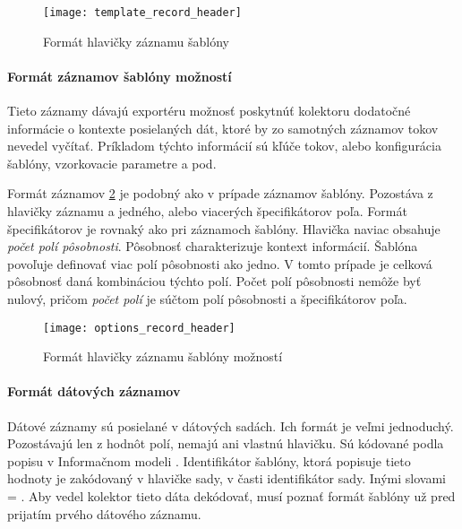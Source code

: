 \begin{figure}[ht!]
\centering
\texttt{[image: template\_record\_header]}
\caption{Formát hlavičky záznamu šablóny}\label{o:template_record_header}
\end{figure}

\paragraph{Formát záznamov šablóny možností}

Tieto záznamy dávajú exportéru možnosť poskytnúť kolektoru dodatočné informácie o kontexte posielaných dát, 
ktoré by zo samotných 
záznamov tokov nevedel vyčítať. Príkladom týchto informácií sú kľúče tokov, alebo konfigurácia šablóny,
vzorkovacie parametre a pod.

Formát záznamov \ref{o:options_record_header} je podobný ako v prípade záznamov šablóny. Pozostáva z hlavičky záznamu 
a jedného, alebo viacerých špecifikátorov poľa. Formát špecifikátorov je rovnaký ako pri záznamoch šablóny.
Hlavička naviac obsahuje \emph{počet polí pôsobnosti}. Pôsobnosť charakterizuje kontext 
informácií. Šablóna povoľuje 
definovať viac polí pôsobnosti ako jedno. V tomto prípade je celková pôsobnosť daná kombináciou týchto polí.
Počet polí pôsobnosti nemôže byť nulový, pričom \emph{počet polí} je 
súčtom polí pôsobnosti a špecifikátorov poľa.

\begin{figure}[ht!]
\centering
\texttt{[image: options\_record\_header]}
\caption{Formát hlavičky záznamu šablóny možností}\label{o:options_record_header}
\end{figure}

\paragraph{Formát dátových záznamov}

Dátové záznamy sú posielané v dátových sadách. Ich formát je veľmi 
jednoduchý. Pozostávajú len z hodnôt polí, nemajú ani vlastnú hlavičku. 
Sú kódované podla popisu v Informačnom modeli \citep{rfc5102}. Identifikátor 
šablóny, ktorá popisuje tieto hodnoty je zakódovaný v hlavičke sady, v časti
identifikátor sady. Inými slovami  = . Aby vedel kolektor tieto dáta dekódovať, musí poznať formát šablóny 
už pred prijatím prvého dátového záznamu.
